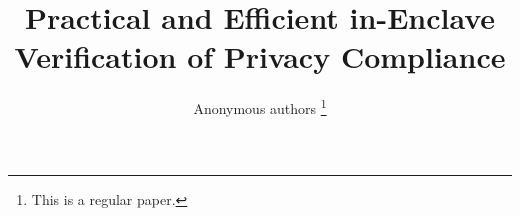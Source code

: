 \documentclass[conference]{IEEEtran}
\begin{document}
\title{Practical and Efficient in-Enclave Verification of Privacy Compliance}



%
\author{
Anonymous authors
\thanks{This is a regular paper.}
}



\maketitle














%

\clearpage


%


%
%
\end{document}
